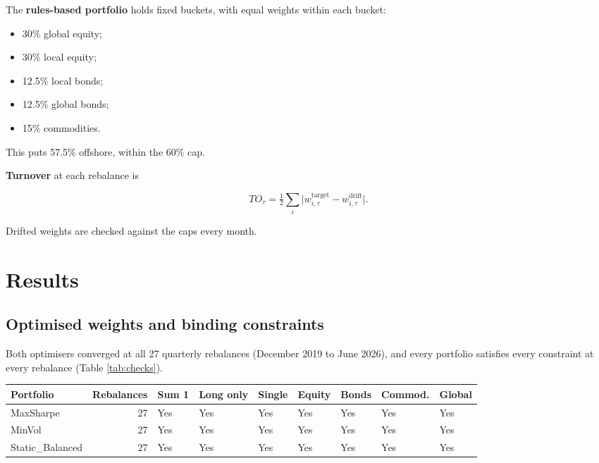 \documentclass[11pt,preprint]{elsarticle}
\let\origtable\table
\let\endorigtable\endtable
\renewenvironment{table}[1][2] {
    \expandafter\origtable\expandafter[H]
} {
    \endorigtable
}
\numberwithin{equation}{section}
\numberwithin{figure}{section}
\numberwithin{table}{section}
\def\tightlist{} %
\begin{document}
The \textbf{rules-based portfolio} holds fixed buckets, with equal
weights within each bucket:

\begin{itemize}
\tightlist
\item
  30\% global equity;
\item
  30\% local equity;
\item
  12.5\% local bonds;
\item
  12.5\% global bonds;
\item
  15\% commodities.
\end{itemize}

This puts 57.5\% offshore, within the 60\% cap.

\textbf{Turnover} at each rebalance is

\[
TO_\tau = \tfrac{1}{2}\sum_i \big|w^{\text{target}}_{i,\tau} - w^{\text{drift}}_{i,\tau}\big|.
\]

Drifted weights are checked against the caps every month.

\section{\texorpdfstring{Results
\label{Results}}{Results }}\label{results}

\subsection{Optimised weights and binding
constraints}\label{optimised-weights-and-binding-constraints}

Both optimisers converged at all 27 quarterly rebalances (December 2019
to June 2026), and every portfolio satisfies every constraint at every
rebalance (Table \ref{tab:checks}).

\begin{table}[!htbp]
\centering
\caption{Constraint checks at every rebalance (weights sum to 1; long only; single asset, equity, bond, commodity and global caps of 35\%, 75\%, 25\%, 15\% and 60\%)} 
\label{tab:checks}
\begingroup\scriptsize
\begin{tabular}{lrlllllll}
  \hline
Portfolio & Rebalances & Sum 1 & Long only & Single & Equity & Bonds & Commod. & Global \\ 
  \hline
MaxSharpe & 27 & Yes & Yes & Yes & Yes & Yes & Yes & Yes \\ 
  MinVol & 27 & Yes & Yes & Yes & Yes & Yes & Yes & Yes \\ 
  Static\_Balanced & 27 & Yes & Yes & Yes & Yes & Yes & Yes & Yes \\ 
   \hline
\end{tabular}
\endgroup
\end{table}
\end{document}
